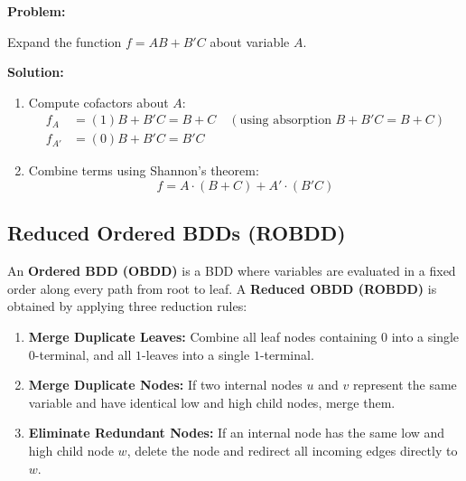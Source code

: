 \documentclass[12pt,a4paper]{article}
\newcommand{\Q}[1]{\textbf{#1}\par\noindent\ignorespaces}
\begin{document}
\begin{tcolorbox}[examplebox, title={Shannon's Expansion Example}]
\Q{Problem:} Expand the function $f = AB + B'C$ about variable $A$.

\textbf{Solution:}\par\noindent
\begin{enumerate}[leftmargin=*, itemsep=2pt]
  \item Compute cofactors about $A$:
        \begin{align*}
          f_A &= (1)B + B'C = B + C \quad (\text{using absorption } B+B'C = B+C) \\
          f_{A'} &= (0)B + B'C = B'C
        \end{align*}
  \item Combine terms using Shannon's theorem:
        \begin{equation*}
          f = A \cdot (B + C) + A' \cdot (B'C)
        \end{equation*}
\end{enumerate}
\end{tcolorbox}

\subsection{Reduced Ordered BDDs (ROBDD)}
An \textbf{Ordered BDD (OBDD)} is a BDD where variables are evaluated in a fixed order along every path from root to leaf. A \textbf{Reduced OBDD (ROBDD)} is obtained by applying three reduction rules:
\begin{enumerate}[leftmargin=*, itemsep=2pt]
  \item \textbf{Merge Duplicate Leaves:} Combine all leaf nodes containing $0$ into a single $0$-terminal, and all $1$-leaves into a single $1$-terminal.
  \item \textbf{Merge Duplicate Nodes:} If two internal nodes $u$ and $v$ represent the same variable and have identical low and high child nodes, merge them.
  \item \textbf{Eliminate Redundant Nodes:} If an internal node has the same low and high child node $w$, delete the node and redirect all incoming edges directly to $w$.
\end{enumerate}
\end{document}
